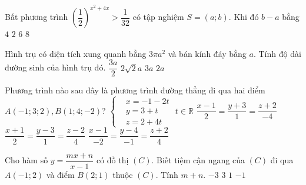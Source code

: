 \begin{ex}%
	Bất phương trình $\left (\dfrac{1}{2}\right )^{x^2+4x}>\dfrac{1}{32}$ có tập nghiệm $S=(a;b)$. Khi đó $b-a$ bằng
	\choice
	{$ 4 $}
	{$ 2 $}
	{\True $ 6 $}
	{$ 8 $}
\end{ex}
\begin{ex}%
	Hình trụ có diện tích xung quanh bằng $3\pi a^2$ và bán kính đáy bằng $a$. Tính độ dài đường sinh của hình trụ đó.
	\choice
	{\True $\dfrac{3a}{2}$}
	{$2\sqrt{2}a$}
	{$3a$}
	{$2a$}
\end{ex}
\begin{ex}%
	Phương trình nào sau đây là phương trình đường thẳng đi qua hai điểm $A\left({-1;3;2}\right),B\left({1;4;-2}\right)$?
	\choice
	{$\left\{\begin{aligned}& x=-1-2t \\& y=3+t \\& z=2+4t 
		\end{aligned}\right. \,\, t\in \mathbb{R}$
	}
	{$\dfrac{x-1}{2}=\dfrac{y+3}{1}=\dfrac{z+2}{-4}$}
	{$\dfrac{x+1}{2}=\dfrac{y-3}{1}=\dfrac{z-2}{4}$}
	{\True $\dfrac{x-1}{-2}=\dfrac{y-4}{-1}=\dfrac{z+2}{4}$}
\end{ex}
\begin{ex}%
	Cho hàm số $y=\dfrac{mx+n}{x-1}$ có đồ thị $ (C) $. Biết tiệm cận ngang của $(C)$ đi qua $A(-1;2)$ và điểm $B(2;1)$ thuộc $ (C)$. Tính $m+n$.
	\choice
	{$ -3 $}
	{$ 3 $}
	{$ 1 $}
	{\True $ -1 $}
\end{ex}
